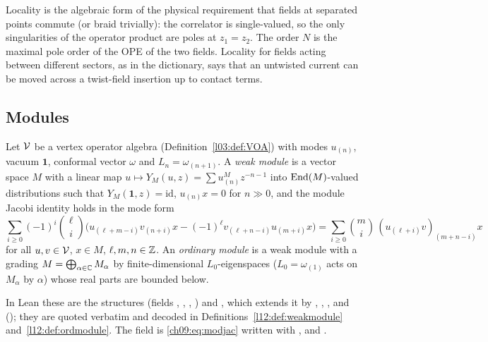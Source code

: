 \begin{physics}
Locality is the algebraic form of the physical requirement that fields at separated points commute (or braid trivially): the correlator is single-valued, so the only singularities of the operator product are poles at $z_1=z_2$. The order $N$ is the maximal pole order of the OPE of the two fields. Locality for fields acting between different sectors, as in the dictionary, says that an untwisted current can be moved across a twist-field insertion up to contact terms.
\end{physics}

\subsection{Modules}

\begin{definition}\label{ch09:def:module}
Let $\mathcal{V}$ be a vertex operator algebra (Definition~\ref{l03:def:VOA}) with modes $u_{(n)}$, vacuum
$\mathbf 1$, conformal vector $\omega$ and $L_n=\omega_{(n+1)}$. A \emph{weak module} is a vector
space $M$ with a linear map $u\mapsto Y_M(u,z)=\sum u^M_{(n)}z^{-n-1}$ into $\operatorname{End}(M)$-valued
distributions such that $Y_M(\mathbf 1,z)=\mathrm{id}$, $u_{(n)}x=0$ for $n\gg0$, and the module
Jacobi identity holds in the mode form
\begin{equation}\label{ch09:eq:modjac}
\sum_{i\ge0}(-1)^i\binom{\ell}{i}\Big(u_{(\ell+m-i)}v_{(n+i)}x-(-1)^\ell v_{(\ell+n-i)}u_{(m+i)}x\Big)
=\sum_{i\ge0}\binom{m}{i}\,(u_{(\ell+i)}v)_{(m+n-i)}x
\end{equation}
for all $u,v\in\mathcal{V}$, $x\in M$, $\ell,m,n\in{\mathbb{Z}}$. An \emph{ordinary module} is a weak module
with a grading $M=\bigoplus_{\alpha\in{\mathbb{C}}}M_\alpha$ by finite-dimensional $L_0$-eigenspaces
($L_0=\omega_{(1)}$ acts on $M_\alpha$ by $\alpha$) whose real parts are bounded below.
\end{definition}

In Lean these are the structures  (fields , ,
, ) and , which extends it by ,
, ,  and 
(); they are quoted verbatim and decoded in
Definitions~\ref{l12:def:weakmodule} and~\ref{l12:def:ordmodule}. The field  is
\eqref{ch09:eq:modjac} written with ,  and .

